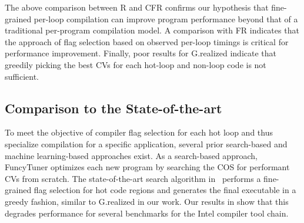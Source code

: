 The above comparison between R and CFR confirms our hypothesis that
fine-grained per-loop compilation can improve
program performance beyond that of a traditional per-program compilation model.
A comparison with FR indicates that the \toolname
approach of flag selection based on observed per-loop timings is
critical for performance improvement.  Finally, poor results for G.realized indicate
that greedily picking the best CVs for each hot-loop and non-loop code
is not sufficient. %
\vspace{-2mm}
\subsection{Comparison to the State-of-the-art} \label{beatPGO}

To meet the objective of compiler flag selection for each hot loop and
thus specialize compilation for a specific application, several prior
search-based and machine learning-based approaches exist.  As a
search-based approach, FuncyTuner optimizes each new program by
searching the COS for performant CVs from scratch.  The
state-of-the-art search algorithm in~\cite{cere} performs a
fine-grained flag selection for hot code regions and generates the
final executable in a greedy fashion, similar to G.realized in our
work.  Our results in  show that
this degrades performance for several benchmarks for the Intel compiler tool chain.

